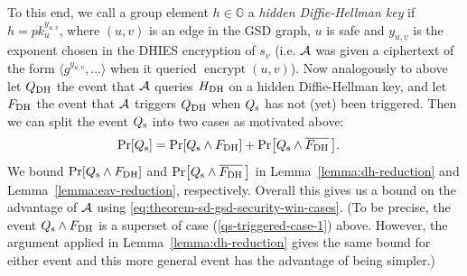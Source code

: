 To this end, we call a group element $h \in \mathbb{G}$ a \emph{hidden Diffie-Hellman key} if $h = pk_u^{y_{u, v}}$, where $(u, v)$ is an edge in the GSD graph, $u$ is safe and $y_{u, v}$ is the exponent chosen in the DHIES encryption of $s_v$ (i.e. $\mathcal{A}$ was given a ciphertext of the form $\langle g^{y_{u, v}}, \ldots\rangle$ when it queried $\operatorname{encrypt}(u, v)$). Now analogously to above let $Q_\mathrm{DH}$ the event that $\mathcal{A}$ queries $H_\mathrm{DH}$ on a hidden Diffie-Hellman key, and let $F_\mathrm{DH}$ the event that $\mathcal{A}$ triggers $Q_\mathrm{DH}$ when $Q_\mathrm{s}$ has not (yet) been triggered.
Then we can split the event $Q_\mathrm{s}$ into two cases as motivated above:
\begin{align*}
	\pr{\qs} & = \pr{\qs \land \fdh} + \pr{\qs \land \overline{\fdh}\,}.
\end{align*}
We bound $\pr{\qs \land \fdh}$ and $\pr{\qs \land \overline{\fdh} \,}$ in Lemma~\ref{lemma:dh-reduction} and Lemma~\ref{lemma:eav-reduction}, respectively. Overall this gives us a bound on the advantage of $\mathcal{A}$ using \eqref{eq:theorem-sd-gsd-security-win-cases}. (To be precise, the event $Q_\mathrm{s} \land F_\mathrm{DH}$ is a superset of case (\ref{qs-triggered-case-1}) above. However, the argument applied in Lemma~\ref{lemma:dh-reduction} gives the same bound for either event and this more general event has the advantage of being simpler.)

